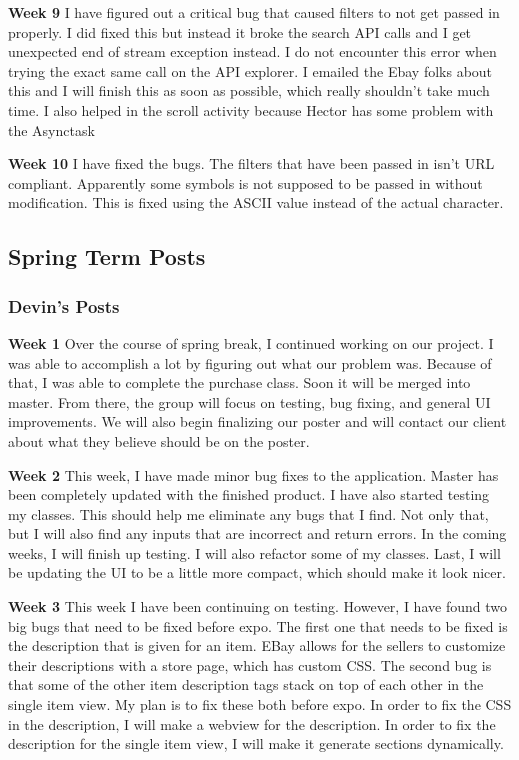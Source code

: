 \documentclass[journal,compsoc, 10pt, draftclsnofoot, onecolumn]{IEEEtran}
\begin{document}
\textbf{Week 9}\newline
I have figured out a critical bug that caused filters to not get passed in properly. I did
fixed this but instead it broke the search API calls and I get unexpected end of stream
exception instead. I do not encounter this error when trying the exact same call on the API
explorer. I emailed the Ebay folks about this and I will finish this as soon as possible, which 
really shouldn't take much time. I also helped in the scroll activity because Hector has some
problem with the Asynctask\newline

\textbf{Week 10}\newline
I have fixed the bugs. The filters that have been passed in isn't URL compliant. Apparently
some symbols is not supposed to be passed in without modification. This is fixed using the
ASCII value instead of the actual character.

\subsection{Spring Term Posts}
\subsubsection*{Devin's Posts}
\textbf{Week 1}\newline
Over the course of spring break, I continued working on our project. I was able to accomplish a 
lot by figuring out what our problem was. Because of that, I was able to complete the purchase
class. Soon it will be merged into master. From there, the group will focus on testing, bug
fixing, and general UI improvements. We will also begin finalizing our poster and will contact
our client about what they believe should be on the poster.\newline

\textbf{Week 2}\newline
This week, I have made minor bug fixes to the application. Master has been completely updated
with the finished product. I have also started testing my classes. This should help me
eliminate any bugs that I find. Not only that, but I will also find any inputs that are
incorrect and return errors. In the coming weeks, I will finish up testing. I will also
refactor some of my classes. Last, I will be updating the UI to be a little more compact, which 
should make it look nicer. \newline

\textbf{Week 3}\newline
This week I have been continuing on testing. However, I have found two big bugs that need to be 
fixed before expo. The first one that needs to be fixed is the description that is given for an item. 
EBay allows for the sellers to customize their descriptions with a store page, which has
custom CSS. The second bug is that some of the other item description tags stack on top of each 
other in the single item view. My plan is to fix these both before expo. In order to fix the
CSS in the description, I will make a webview for the description. In order to fix the
description for the single item view, I will make it generate sections dynamically. \newline
\end{document}
